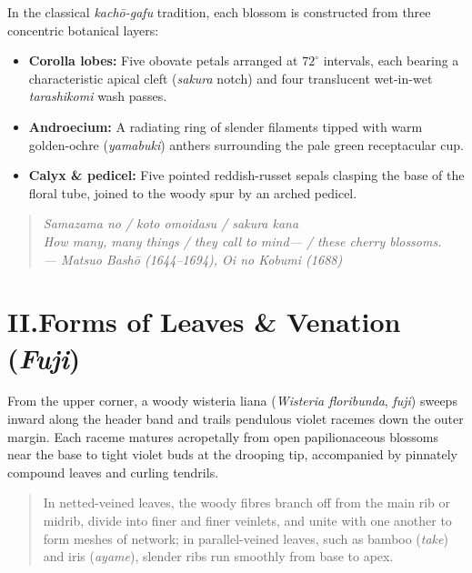 \documentclass[11pt,a4paper,twoside]{article}
\begin{document}
In the classical \emph{kach\=o-gafu} tradition, each blossom is constructed from three concentric botanical layers:
\begin{itemize}
  \item \textbf{Corolla lobes:} Five obovate petals arranged at $72^\circ$ intervals, each bearing a characteristic apical cleft (\emph{sakura} notch) and four translucent wet-in-wet \emph{tarashikomi} wash passes.
  \item \textbf{Androecium:} A radiating ring of slender filaments tipped with warm golden-ochre (\emph{yamabuki}) anthers surrounding the pale green receptacular cup.
  \item \textbf{Calyx \& pedicel:} Five pointed reddish-russet sepals clasping the base of the floral tube, joined to the woody spur by an arched pedicel.
\end{itemize}

\begin{quote}
\itshape
Samazama no / koto omoidasu / sakura kana\\[2pt]
How many, many things / they call to mind--- / these cherry blossoms.\\[2pt]
\upshape\small --- Matsuo Bash\=o (1644--1694), \emph{Oi no Kobumi} (1688)
\end{quote}

\clearpage

\section*{II.\quad Forms of Leaves \& Venation (\emph{Fuji})}

From the upper corner, a woody wisteria liana (\emph{Wisteria floribunda}, \emph{fuji}) sweeps inward along the header band and trails pendulous violet racemes down the outer margin. Each raceme matures acropetally from open papilionaceous blossoms near the base to tight violet buds at the drooping tip, accompanied by pinnately compound leaves and curling tendrils.

\begin{quote}
  In netted-veined leaves, the woody fibres branch off from the main rib or midrib, divide into finer and finer veinlets, and unite with one another to form meshes of network; in parallel-veined leaves, such as bamboo (\emph{take}) and iris (\emph{ayame}), slender ribs run smoothly from base to apex.
\end{quote}
\end{document}
